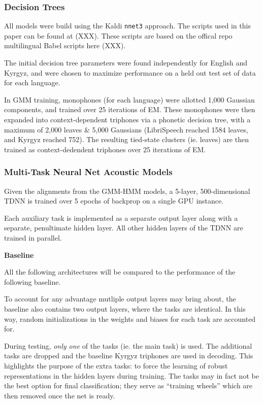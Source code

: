 \documentclass[a4paper]{article}
\begin{document}
\subsubsection{Decision Trees}
All models were build using the Kaldi \texttt{nnet3} approach. The scripts used in this paper can be found at (XXX). These scripts are based on the offical repo multilingual Babel scripts here (XXX).

The initial decision tree parameters were found independently for English and Kyrgyz, and were chosen to maximize performance on a held out test set of data for each language.

In GMM training, monophones (for each language) were allotted 1,000 Gaussian components, and trained over 25 iterations of EM. These monophones were then expanded into context-dependent triphones via a phonetic decision tree, with a maximum of 2,000 leaves \& 5,000 Gaussians (LibriSpeech reached 1584 leaves, and Kyrgyz reached 752). The resulting tied-state clusters (ie. leaves) are then trained as context-dedendent triphones over 25 iterations of EM.


\subsubsection{Multi-Task Neural Net Acoustic Models}

Given the alignments from the GMM-HMM models, a 5-layer, 500-dimensional TDNN is trained over 5 epochs of backprop on a single GPU instance.

Each auxiliary task is implemented as a separate output layer along with a separate, penultimate hidden layer. All other hidden layers of the TDNN are trained in parallel.



\textbf{Baseline}

All the following architectures will be compared to the performance of the following baseline.

To account for any advantage mutliple output layers may bring about, the baseline also contains two output layers, where the tasks are identical. In this way, random initializations in the weights and biases for each task are accounted for.

During testing, \textit{only one} of the tasks (ie. the main task) is used. The additional tasks are dropped and the baseline Kyrgyz triphones are used in decoding. This highlights the purpose of the extra tasks: to force the learning of robust representations in the hidden layers during training. The tasks may in fact not be the best option for final classification; they serve as ``training wheels'' which are then removed once the net is ready.
\end{document}
